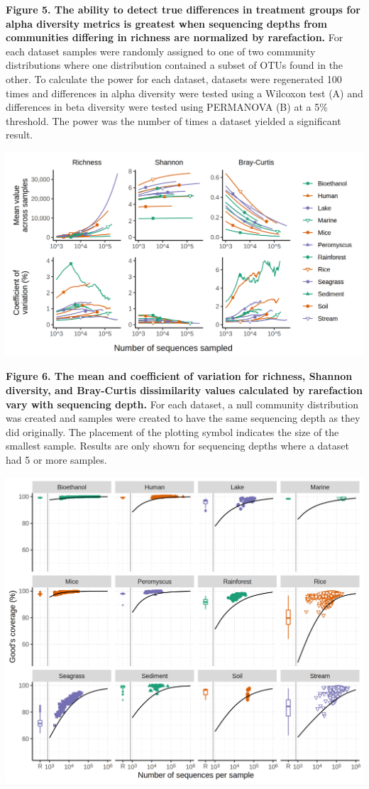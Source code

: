 \documentclass[
]{article}
\begin{document}
\textbf{Figure 5. The ability to detect true differences in treatment
groups for alpha diversity metrics is greatest when sequencing depths
from communities differing in richness are normalized by rarefaction.}
For each dataset samples were randomly assigned to one of two community
distributions where one distribution contained a subset of OTUs found in
the other. To calculate the power for each dataset, datasets were
regenerated 100 times and differences in alpha diversity were tested
using a Wilcoxon test (A) and differences in beta diversity were tested
using PERMANOVA (B) at a 5\% threshold. The power was the number of
times a dataset yielded a significant result.

\newpage

\includegraphics{figure_6.png}

\textbf{Figure 6. The mean and coefficient of variation for richness,
Shannon diversity, and Bray-Curtis dissimilarity values calculated by
rarefaction vary with sequencing depth.} For each dataset, a null
community distribution was created and samples were created to have the
same sequencing depth as they did originally. The placement of the
plotting symbol indicates the size of the smallest sample. Results are
only shown for sequencing depths where a dataset had 5 or more samples.

\newpage

\includegraphics{figure_7.png}
\end{document}
